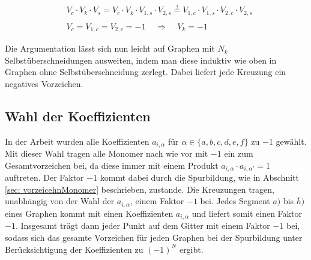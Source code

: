 \begin{equation}
\begin{aligned}
&V_c \cdot V_k \cdot V_s = V_c \cdot V_k \cdot V_{1,s} \cdot V_{2,s}   \overset{!}{=} V_{1,c} \cdot V_{1,s}  \cdot V_{2,c} \cdot V_{2,s} \\
\\
& V_{c} =  V_{1,c} = V_{2,c} = -1  \;\;\;\;\Rightarrow\;\;\;\;   V_k = -1
\end{aligned}
\end{equation}

\noindent Die Argumentation lässt sich nun leicht auf Graphen mit $N_k$ Selbstüberschneidungen ausweiten, indem man diese induktiv wie oben in Graphen ohne Selbstüberschneidung zerlegt. Dabei liefert jede Kreuzung ein negatives Vorzeichen. 

\subsection{Wahl der Koeffizienten}
In der Arbeit wurden alle Koeffizienten $a_{i,\alpha}$ für $\alpha \in \{a,b,c,d,e,f\}$ zu $-1$ gewählt. Mit dieser Wahl tragen alle Monomer nach wie vor mit $-1$ ein zum Gesamtvorzeichen bei, da diese immer mit einem Produkt ${a_{i,\alpha} \cdot a_{i,\alpha'} = 1}$ auftreten. Der Faktor $-1$ kommt dabei durch die Spurbildung, wie in Abschnitt \ref{sec: vorzeicehnMonomer} beschrieben, zustande. Die Kreuzungen tragen, unabhängig von der Wahl der $a_{i,\alpha}$, einem Faktor $-1$ bei. Jedes Segment $a)$ bis $\bar{h})$ eines Graphen kommt mit einen Koeffizienten $a_{i,\alpha}$ und liefert somit einen Faktor $-1$. Insgesamt trägt dann jeder Punkt auf dem Gitter mit einem Faktor $-1$ bei, sodass sich das gesamte Vorzeichen für jeden Graphen bei der Spurbildung unter Berücksichtigung der Koeffizienten zu $(-1)^N$ ergibt.